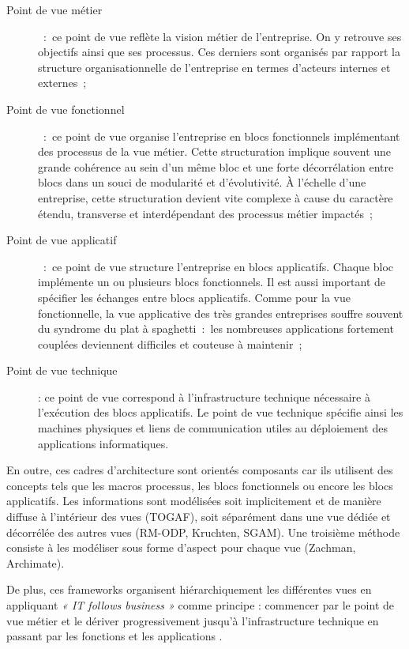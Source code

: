 \begin{description}

\item[Point de vue métier]~:~ce point de vue reflète la vision métier de l'entreprise. On y retrouve ses objectifs ainsi que ses processus. Ces derniers  sont organisés par rapport la structure organisationnelle de l'entreprise en termes d'acteurs internes et externes~;

\item[Point de vue fonctionnel]~:~ce point de vue organise l'entreprise en blocs fonctionnels implémentant des processus de la vue métier. Cette structuration implique souvent une grande cohérence au sein d'un même bloc et une forte décorrélation entre blocs dans un souci de modularité et d'évolutivité. À l'échelle d'une entreprise, cette structuration devient vite complexe à cause du caractère étendu, transverse et interdépendant des processus métier impactés~;

\item[Point de vue applicatif]~:~ce point de vue structure l'entreprise en blocs applicatifs. Chaque bloc implémente un ou plusieurs blocs fonctionnels. Il est aussi important de spécifier les échanges entre blocs applicatifs. Comme pour la vue fonctionnelle, la vue applicative des très grandes entreprises souffre souvent du syndrome du plat à spaghetti~:~les nombreuses applications fortement couplées deviennent difficiles et couteuse à maintenir~;

\item[Point de vue technique] : ce point de vue correspond à l'infrastructure technique nécessaire à l'exécution des blocs applicatifs. Le point de vue technique spécifie ainsi les machines physiques et liens de communication utiles au déploiement des applications informatiques. 
\end{description}

En outre, ces cadres d'architecture sont orientés composants car ils utilisent des concepts tels que les macros processus, les blocs fonctionnels ou encore les blocs applicatifs. Les informations sont modélisées soit implicitement et de manière diffuse à l'intérieur des vues (TOGAF), soit séparément dans une vue dédiée et décorrélée des autres vues (RM-ODP, Kruchten, SGAM). Une troisième méthode consiste à les modéliser sous forme d'aspect pour chaque vue (Zachman, Archimate).

De plus, ces frameworks organisent hiérarchiquement les différentes vues en appliquant \emph{« IT follows business »} comme principe : commencer par le point de vue métier et le dériver progressivement jusqu'à l'infrastructure technique en passant par les fonctions et les applications \cite{winter2006essential}.


